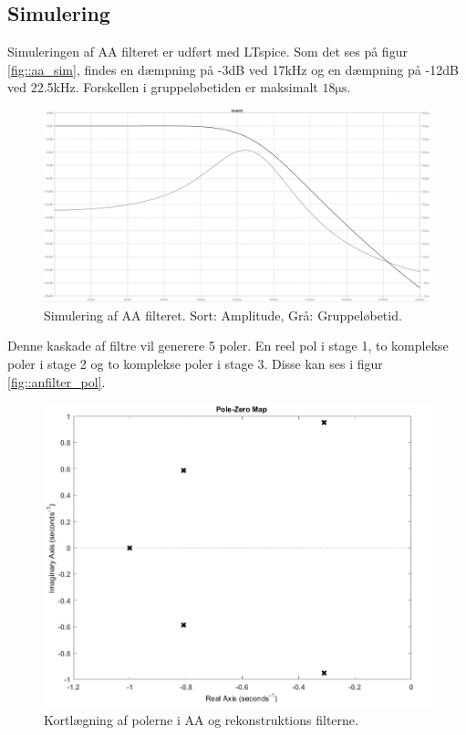 \subsection{Simulering}
Simuleringen af AA filteret er udført med LTspice. Som det ses på figur \ref{fig::aa_sim}, findes en dæmpning på -3dB ved 17kHz og en dæmpning på -12dB ved 22.5kHz. Forskellen i gruppeløbetiden er maksimalt $18 \si{\micro \second}$.
\begin{figure}[h!]
	\centering
	\includegraphics[scale=0.2]{./billeder/aa_sim1}
	\caption{Simulering af AA filteret. Sort: Amplitude, Grå: Gruppeløbetid.}
	\label{fig::afilter_aasim}
\end{figure}
\FloatBlock
Denne kaskade af filtre vil generere 5 poler. En reel pol i stage 1, to komplekse poler i stage 2 og to komplekse poler i stage 3. Disse kan ses i figur \ref{fig::anfilter_pol}.

\begin{figure}[h!]
	\centering
	\includegraphics[scale = 0.4]{./billeder/pzmap}
	\caption{Kortlægning af polerne i AA og rekonstruktions filterne.}
	\label{fig:afilter_pol}
\end{figure}
\FloatBlock

